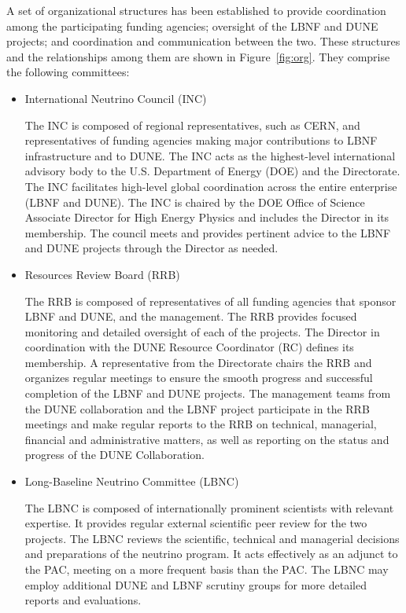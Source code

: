 A set  of  organizational structures  has been established  to  provide
coordination  among  the  participating  funding agencies;
oversight of the LBNF and DUNE projects;
and coordination and communication between the 
two. These structures and the relationships among them are shown 
in Figure~\ref{fig:org}. They comprise the following committees:
\begin{itemize}
\item International Neutrino Council (INC)

The INC is composed of regional representatives, such as CERN, and representatives of funding agencies making major contributions to LBNF infrastructure and to DUNE. The INC acts as the highest-level international advisory body to the U.S. Department of Energy (DOE) and the \fnal Directorate. The INC facilitates high-level global coordination across the entire enterprise (LBNF and DUNE). The INC is chaired by the DOE Office of Science Associate Director for High Energy Physics and includes the \fnal Director in its membership. The council meets and provides pertinent advice to the LBNF and DUNE projects through the \fnal Director as needed.
\item Resources Review Board (RRB)

The RRB is composed of representatives of all funding agencies that sponsor LBNF and DUNE, and the \fnal management. The RRB provides focused monitoring and detailed oversight of each of the projects. The \fnal Director in coordination with the DUNE Resource Coordinator (RC) defines its membership. A representative from the \fnal Directorate chairs the RRB and organizes regular meetings to ensure the smooth progress and successful completion of the LBNF and DUNE projects. The management teams from the DUNE collaboration and the LBNF project participate in the RRB meetings and make regular reports to the RRB on technical, managerial, financial and administrative matters, as well as reporting on the status and progress of the DUNE Collaboration.

\item Long-Baseline Neutrino Committee (LBNC)

The LBNC is composed of internationally prominent scientists with relevant expertise. It provides regular external scientific peer review for the two projects. The LBNC reviews the scientific, technical and managerial decisions and preparations of the neutrino program. It acts effectively as an adjunct to the \fnal PAC, meeting on a more frequent basis than the PAC. The LBNC may employ additional DUNE and LBNF scrutiny groups for more detailed reports and evaluations. 


\end{itemize}
